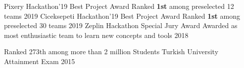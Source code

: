 \vspace{-3.2mm}



\begin{cvhonors}
  \cvhonor
    {Pixery Hackathon'19 Best Project Award} %
    {Ranked \textbf{1st} among preselected 12 teams} %
    {} %
    {2019} %
  \cvhonor
    {Ciceksepeti Hackathon'19 Best Project Award} %
    {Ranked \textbf{1st} among preselected 30 teams} %
    {} %
    {2019} %
  \cvhonor
    {Zeplin Hackathon Special Jury Award} %
    {Awarded as most enthusiastic team to learn new concepts and tools} %
    {} %
    {2018} %



  \cvhonor
    {Ranked 273th among more than 2 million Students} %
    {Turkish University Attainment Exam} %
    {} %
    {2015} %
    \vspace{-5mm}


\begin{comment}
  \cvhonor
    {Dean’s High Honor Roll } %
    {Listed in Dean's High Honor Roll for Spring 2017, Spring 2018 and Spring 2019} %
    {} %
    {2017} %
%
  \cvhonor
    {Ranked 1th among more than 1 million Students} %
    {Turkish High School Attainment Exam} %
    {} %
    {2011} %



  \cvhonor
    {Ranked in top 50} %
    {TUBITAK National Middle School Mathematic Olympiads} %
    {} %
    {2014} %


  \cvhonor
    {Vehbi Koc Scholar} %
    {Awarded for SPA over 3.50 /4.00 in Fall 2016, Spring 2017 and Fall 2017} %
    {} %
    {2017} %
\end{comment}
\end{cvhonors}



